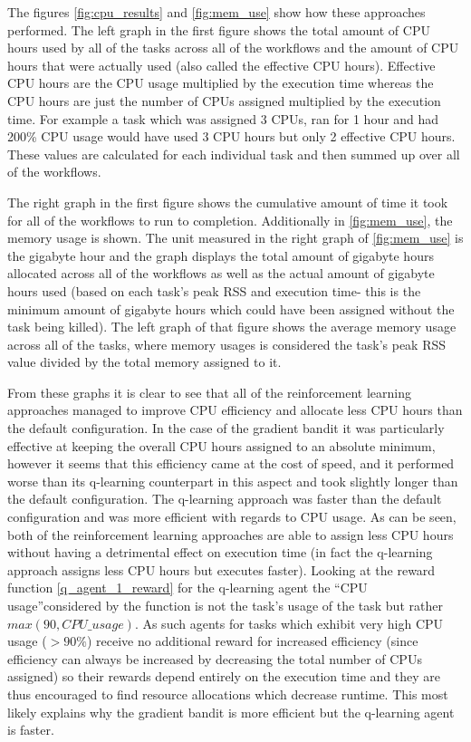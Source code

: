 The figures \ref{fig:cpu_results} and \ref{fig:mem_use} show how these approaches performed. The left graph in the first figure shows the total amount of CPU hours used by all of the tasks across all of the workflows and the amount of CPU hours that were actually used (also called the effective CPU hours). Effective CPU hours are the CPU usage multiplied by the execution time whereas the CPU hours are just the number of CPUs assigned multiplied by the execution time. For example a task which was assigned 3 CPUs, ran for 1 hour and had 200\% CPU usage would have used 3 CPU hours but only 2 effective CPU hours. These values are calculated for each individual task and then summed up over all of the workflows.

The right graph in the first figure shows the cumulative amount of time it took for all of the workflows to run to completion. Additionally in \ref{fig:mem_use}, the memory usage is shown. The unit measured in the right graph of \ref{fig:mem_use} is the gigabyte hour and the graph displays the total amount of gigabyte hours allocated across all of the workflows as well as the actual amount of gigabyte hours used (based on each task’s peak RSS and execution time- this is the minimum amount of gigabyte hours which could have been assigned without the task being killed). The left graph of that figure shows the average memory usage across all of the tasks, where memory usages is considered the task’s peak RSS value divided by the total memory assigned to it. 

From these graphs it is clear to see that all of the reinforcement learning approaches managed to improve CPU efficiency and allocate less CPU hours than the default configuration. In the case of the gradient bandit it was particularly effective at keeping the overall CPU hours assigned to an absolute minimum, however it seems that this efficiency came at the cost of speed, and it performed worse than its q-learning counterpart in this aspect and took slightly longer than the default configuration. The q-learning approach was faster than the default configuration and was more efficient with regards to CPU usage. As can be seen, both of the reinforcement learning approaches are able to assign less CPU hours without having a detrimental effect on execution time (in fact the q-learning approach assigns less CPU hours but executes faster). Looking at the reward function \ref{q_agent_1_reward} for the q-learning agent the “CPU usage”considered by the function is not the task’s usage of the task but rather $max(90,CPU\_usage)$. As such agents for tasks which exhibit very high CPU usage ($>90\%$) receive no additional reward for increased efficiency (since efficiency can always be increased by decreasing the total number of CPUs assigned) so their rewards depend entirely on the execution time and they are thus encouraged to find resource allocations which decrease runtime. This most likely explains why the gradient bandit is more efficient but the q-learning agent is faster.

